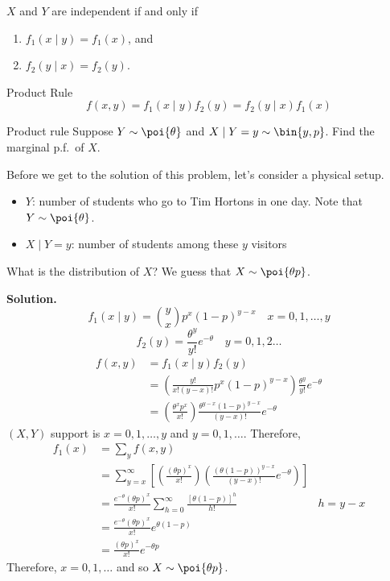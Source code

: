 \begin{Theorem}{}{}
    $ X $ and $ Y $ are independent if and only if
    \begin{enumerate}[label=(\arabic*)]
        \item $ f_1(x\mid y)=f_1(x) $, and
        \item $ f_2(y\mid x)=f_2(y) $.
    \end{enumerate}
\end{Theorem}
\begin{Theorem}{Product Rule}{}
    \[ f(x,y)=f_1(x\mid y)f_2(y)=f_2(y\mid x)f_1(x)  \]
\end{Theorem}
\begin{Example}{Product rule}{}
    Suppose $ Y \sim \poi{\theta} $ and $ X\mid Y=y \sim \bin{y,p} $.
    Find the marginal p.f.\ of $ X $.

    Before we get to the solution of this problem, let's consider a physical setup.
    \begin{itemize}
        \item $ Y $: number of students who go to Tim Hortons
              in one day. Note that $ Y \sim \poi{\theta} $.
        \item $ X\mid Y=y $: number of students among
              these $ y $ visitors
    \end{itemize}
    What is the distribution of $ X $? We guess that $ X \sim \poi{\theta p} $.

    \textbf{Solution.}
    \[ f_1(x\mid y)=\binom{y}{x}p^x (1-p)^{y-x}\quad x=0,1,\ldots,y \]
    \[ f_2(y)=\frac{\theta^y}{y!}e^{-\theta}\quad y=0,1,2\ldots  \]
    \begin{align*}
        f(x,y)
         & =f_1(x\mid y)f_2(y)                                                                        \\
         & =\left( \frac{y!}{x!(y-x)!}p^x(1-p)^{y-x} \right)\frac{\theta^y}{y!} e^{-\theta}           \\
         & =\left( \frac{\theta^x p^x}{x!}  \right)\frac{\theta^{y-x}(1-p)^{y-x}}{(y-x)!} e^{-\theta}
    \end{align*}
    $ (X,Y) $ support is $ x=0,1,\ldots,y $ and $ y=0,1,\ldots $. Therefore,
    \begin{align*}
        f_1(x)
         & =\sum_{y}f(x,y)                                                                                                 \\
         & =\sum_{y=x}^{\infty}
        \left[ \left( \frac{(\theta p)^x}{x!} \right)\left( \frac{(\theta(1-p))^{y-x}}{(y-x)!} e^{-\theta} \right) \right] \\
         & =\frac{e^{-\theta} (\theta p)^x}{x!} \sum_{h=0}^{\infty} \frac{\left[ \theta(1-p) \right]^h}{h!} & h=y-x        \\
         & =\frac{e^{-\theta} (\theta p)^x}{x!}e^{\theta(1-p)}                                                             \\
         & =\frac{(\theta p)^x}{x!}e^{-\theta p}
    \end{align*}
    Therefore, $ x=0,1,\ldots $ and so $ X \sim \poi{\theta p} $.
\end{Example}
